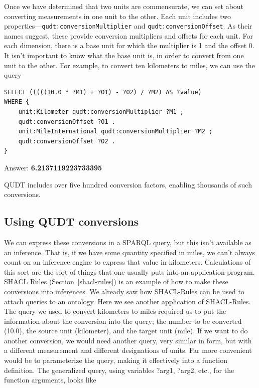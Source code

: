 Once we have determined that two units are commensurate, we can set
about converting measurements in one unit to the other. Each unit
includes two properties---\texttt{qudt:conversionMultiplier} and
\texttt{qudt:conversionOffset}. As their names suggest, these provide conversion
multipliers and offsets for each unit. For each dimension, there is a
base unit for which the multiplier is 1 and the offset 0. It isn't
important to know what the base unit is, in order to convert from one
unit to the other. For example, to convert ten kilometers to miles, we
can use the query

\begin{lstlisting}
SELECT (((((10.0 * ?M1) + ?O1) - ?O2) / ?M2) AS ?value)
WHERE {
    unit:Kilometer qudt:conversionMultiplier ?M1 ;
    qudt:conversionOffset ?O1 .
    unit:MileInternational qudt:conversionMultiplier ?M2 ;
    qudt:conversionOffset ?O2 .
}
\end{lstlisting}

Answer: \textbf{6.2137119223733395}

QUDT includes over five hundred conversion factors, enabling thousands
of such conversions.

\subsection{Using QUDT conversions}

We can express these conversions in a SPARQL query, but this isn't
available as an inference. That is, if we have some quantity specified
in miles, we can't always count on an inference engine to express that
value in kilometers. Calculations of this sort are the sort of things
that one usually puts into an application program. SHACL Rules
(Section~\ref{shacl-rules}) is an example of
how to make these conversions into inferences.  
We already saw how SHACL-Rules can  be used to
attach queries to an ontology. Here we see another application of SHACL-Rules.
The query we used to convert kilometers to miles required us to put the
information about the conversion into the query; the number to be
converted (10.0), the source unit (kilometer), and the target unit
(mile). If we want to do another conversion, we would need another
query, very similar in form, but with a different measurement and
different designations of units. Far more convenient would be to
parameterize the query, making it effectively into a function
definition. The generalized query, using variables ?arg1, ?arg2, etc.,
for the function arguments, looks like

